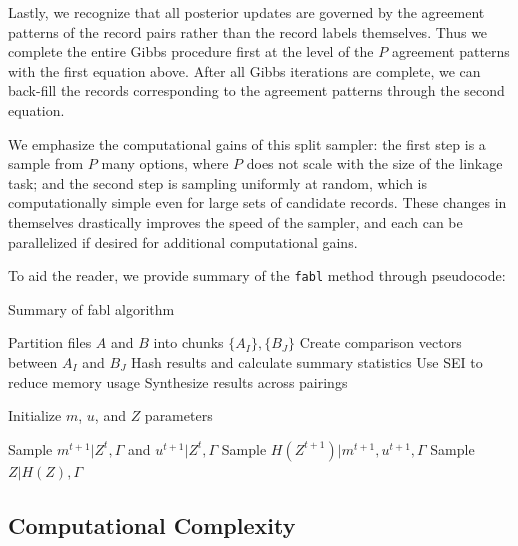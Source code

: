 \documentclass[12pt,letterpaper]{article}
\newcommand{\1}[1]{\mathbb{I}\!\left[#1\right]} %
\begin{document}
Lastly, we recognize that all posterior updates are governed by the
agreement patterns of the record pairs rather than the record labels
themselves. Thus we complete the entire Gibbs procedure first at the
level of the \(P\) agreement patterns with the first equation above.
After all Gibbs iterations are complete, we can back-fill the records corresponding to the agreement patterns through the second equation.

We emphasize the computational gains of this split sampler: the first step is a sample from $P$ many options, where $P$ does not scale with the size of the linkage task; and the second step is sampling uniformly at random, which is computationally simple even for large sets of candidate records. These changes in themselves drastically improves the speed of the sampler, and each can be parallelized if desired for additional computational gains. 

To aid the reader, we provide summary of the \texttt{fabl} method through pseudocode:

\begin{algorithm}[h!]
	\caption{Summary of fabl algorithm}
	\begin{algorithmic}[1]
		
		\State Partition files $A$ and $B$ into chunks $\{A_I\}, \{B_J\}$
		\State Create comparison vectors between $A_I$ and $B_J$
		\State Hash results and calculate summary statistics
		\State Use SEI to reduce memory usage
		\EndFor
		\State Synthesize results across pairings
		\EndProcedure
		
		\State Initialize $m$, $u$, and $Z$ parameters
		
		\State Sample $m^{t+1}|Z^{t}, \Gamma$ and  $u^{t+1}|Z^{t}, \Gamma$ 
		\State Sample $H\left(Z^{t+1}\right)|m^{t+1}, u^{t+1}, \Gamma$  
		\EndFor
		\State Sample $Z | H(Z), \Gamma$ 

		\EndProcedure
		
	\end{algorithmic}
\end{algorithm}

\hypertarget{computational-complexity}{%
	\subsection{Computational Complexity}\label{computational-complexity}}
\end{document}
